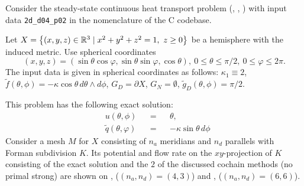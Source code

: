 \begin{example}
  \label{cmc/diffusion/continuous/steady_state/examples/2d_d04_p02-example}
  Consider the steady-state continuous heat transport problem
  (,
   ,
   )
  with input data \verb|2d_d04_p02| in the nomenclature of the C codebase.

  Let $X = \left\{ (x, y, z) \in \mathbb{R}^3 \mid x^2 + y^2 + z^2 = 1,\ z \geq 0 \right\}$ be a
  hemisphere with the induced metric.
  Use spherical coordinates
  \begin{equation}
    (x, y, z)
    = (\sin \theta \cos \varphi, \sin \theta \sin \varphi, \cos \theta),\
    0 \leq \theta \leq \pi / 2,\
    0 \leq \varphi \leq 2 \pi.
  \end{equation}
  The input data is given in spherical coordinates as follows:
    $\kappa_1 \equiv 2$,
    $\tilde{f}(\theta, \phi) = - \kappa \cos \theta\, d \theta \wedge d \phi$,
    $G_D = \partial X$,
    $G_N = \emptyset$,
    $\tilde{g}_D(\theta, \phi) = \pi / 2$.

  This problem has the following exact solution:
  \begin{subequations}
    \begin{alignat}{3}
      & u(\theta, \phi) && = && \theta, \\
      & \tilde{q}(\theta, \varphi) && = && - \kappa \sin \theta\, d \phi
    \end{alignat}
  \end{subequations}
  Consider a mesh $M$ for $X$ consisting of $n_a$ meridians and $n_d$ parallels
  with Forman subdivision $K$.
  Its potential and flow rate on the $xy$-projection of $K$ consisting of the
  exact solution and the $2$ of the discussed cochain methods (no primal strong)
  are shown on
  ,
  ($(n_a, n_d) = (4, 3)$)
  and
  ,
  ($(n_a, n_d) = (6, 6)$).
\end{example}
